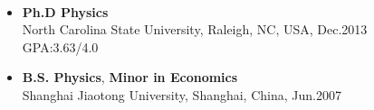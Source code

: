 \documentclass[11pt]{article} %
\begin{document}
 
 \\
\vspace{-5mm}

\begin{itemize}
  \item {\bf Ph.D Physics} \hspace{100mm}   \\
    North Carolina State University, Raleigh, NC, USA, Dec.2013\\
     GPA:3.63/4.0\\
\vspace{-4mm}
  \item {\bf B.S. Physics}, {\bf Minor in Economics}\\
    Shanghai Jiaotong University, Shanghai, China, Jun.2007\\
\vspace{-6mm}
\end{itemize}

\vspace{-7mm}  
\end{document}
